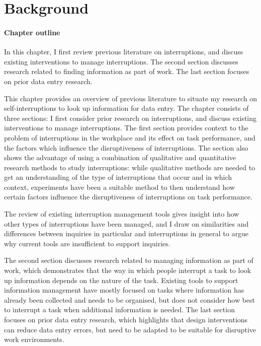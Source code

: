 \chapter{Background}\label{ch:Background}

\begin{mynote}
\subsubsection{Chapter outline}
In this chapter, I first review previous literature on interruptions, and discuss existing interventions to manage interruptions. The second section discusses research related to finding information as part of work. The last section focuses on prior data entry research. 
\end{mynote}

This chapter provides an overview of previous literature to situate my research on self-interruptions to look up information for data entry. The chapter consists of three sections: I first consider prior research on interruptions, and discuss existing interventions to manage interruptions. The first section provides context to the problem of interruptions in the workplace and its effect on task performance, and the factors which influence the disruptiveness of interruptions. The section also shows the advantage of using a combination of qualitative and quantitative research methods to study interruptions: while qualitative methods are needed to get an understanding of the type of interruptions that occur and in which context, experiments have been a suitable method to then understand how certain factors influence the disruptiveness of interruptions on task performance. 

The review of existing interruption management tools gives insight into how other types of interruptions have been managed, and I draw on similarities and differences between inquiries in particular and interruptions in general to argue why current tools are insufficient to support inquiries. 

The second section discusses research related to managing information as part of work, which demonstrates that the way in which people interrupt a task to look up information depends on the nature of the task. Existing tools to support information management have mostly focused on tasks where information has already been collected and needs to be organised, but does not consider how best to interrupt a task when additional information is needed. The last section focuses on prior data entry research, which highlights that design interventions can reduce data entry errors, but need to be adapted to be suitable for disruptive work environments. 


